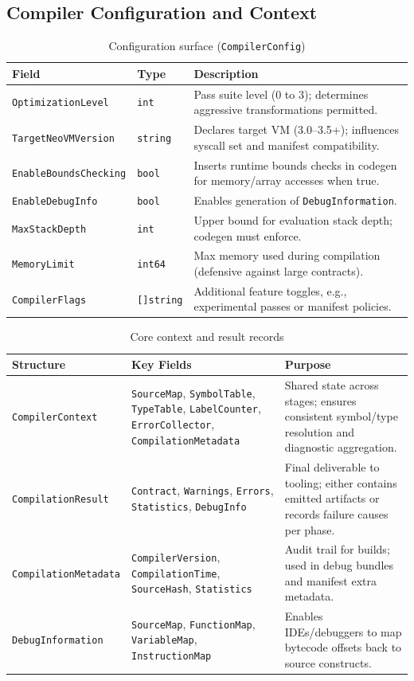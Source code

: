 \documentclass[11pt]{article}
\begin{document}
\subsection{Compiler Configuration and Context}
\begin{table}[H]
\centering
\caption{Configuration surface (\texttt{CompilerConfig})}
\renewcommand{\arraystretch}{1.12}
\begin{tabularx}{\textwidth}{@{}p{}p{}X@{}}
\toprule
Field & Type & Description \\
\midrule
\texttt{OptimizationLevel} & \texttt{int} & Pass suite level (\(0\) to \(3\)); determines aggressive transformations permitted.\\
\texttt{TargetNeoVMVersion} & \texttt{string} & Declares target VM (3.0--3.5+); influences syscall set and manifest compatibility.\\
\texttt{EnableBoundsChecking} & \texttt{bool} & Inserts runtime bounds checks in codegen for memory/array accesses when true.\\
\texttt{EnableDebugInfo} & \texttt{bool} & Enables generation of \texttt{DebugInformation}.\\
\texttt{MaxStackDepth} & \texttt{int} & Upper bound for evaluation stack depth; codegen must enforce.\\
\texttt{MemoryLimit} & \texttt{int64} & Max memory used during compilation (defensive against large contracts).\\
\texttt{CompilerFlags} & \texttt{[]string} & Additional feature toggles, e.g., experimental passes or manifest policies.\\
\bottomrule
\end{tabularx}
\end{table}

\begin{table}[H]
\centering
\caption{Core context and result records}
\renewcommand{\arraystretch}{1.12}
\begin{tabularx}{\textwidth}{@{}p{}p{}X@{}}
\toprule
Structure & Key Fields & Purpose \\
\midrule
\texttt{CompilerContext} & \texttt{SourceMap}, \texttt{SymbolTable}, \texttt{TypeTable}, \texttt{LabelCounter}, \texttt{ErrorCollector}, \texttt{CompilationMetadata} & Shared state across stages; ensures consistent symbol/type resolution and diagnostic aggregation.\\
\texttt{CompilationResult} & \texttt{Contract}, \texttt{Warnings}, \texttt{Errors}, \texttt{Statistics}, \texttt{DebugInfo} & Final deliverable to tooling; either contains emitted artifacts or records failure causes per phase.\\
\texttt{CompilationMetadata} & \texttt{CompilerVersion}, \texttt{CompilationTime}, \texttt{SourceHash}, \texttt{Statistics} & Audit trail for builds; used in debug bundles and manifest extra metadata.\\
\texttt{DebugInformation} & \texttt{SourceMap}, \texttt{FunctionMap}, \texttt{VariableMap}, \texttt{InstructionMap} & Enables IDEs/debuggers to map bytecode offsets back to source constructs.\\
\bottomrule
\end{tabularx}
\end{table}
\end{document}
